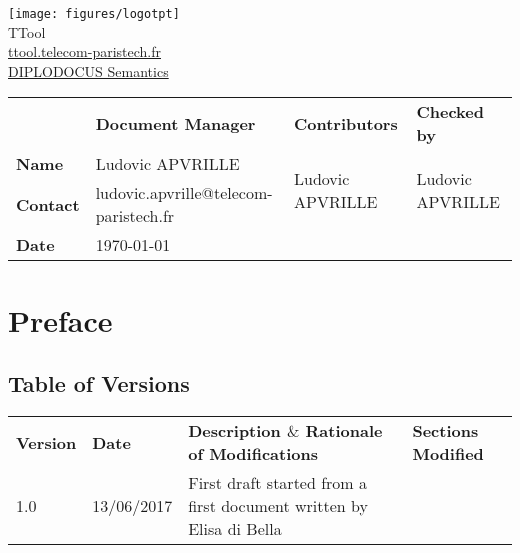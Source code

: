 \documentclass[12pt]{article}
\begin{document}
\sloppy 

\begin{center}

\texttt{[image: figures/logotpt]}
\vspace{10 pt}\\
\Huge TTool \\
\vspace{10 pt}
\Large \url{ttool.telecom-paristech.fr}
\vspace{20 pt}\\
\underline{\Large DIPLODOCUS Semantics}
\vspace{30 pt}
\end{center}

\begin{table}[H]
\large
\centering
\begin{adjustbox}{width=\textwidth}
\begin{tabular}{ |p{1.6cm}|p{6.0cm}|p{4.2cm}|p{4.2cm}| }
\hhline{----}
 & \textbf{Document Manager} & \textbf{Contributors}  & \textbf{Checked by}  \\ 
\hhline{----}
\textbf{Name}   & Ludovic APVRILLE & \multirow{2}{*}{Ludovic APVRILLE} &
\multirow{2}{*}{Ludovic APVRILLE} \\
\hhline{--~~}
\textbf{Contact} & ludovic.apvrille@telecom-paristech.fr &  &  \\ 
\hhline{--~~}
\textbf{Date} & \today &  &  \\ 
\hline
\end{tabular}
\end{adjustbox}
\end{table}

\newpage
\tableofcontents


\newpage
\section{Preface}

\subsection{Table of Versions}

\begin{table}[H]
\large
\centering
\begin{adjustbox}{width=\textwidth}
\begin{tabular}{ |p{1.5cm}|p{2.5cm}|p{9.0cm}|p{3.0cm}| }
\hhline{----}
\textbf{Version} & \textbf{Date} & \textbf{Description  $  \&  $  Rationale of
Modifications} & \textbf{Sections Modified} \\
\hhline{----}
1.0 & 13/06/2017 & First draft started from a first document written by Elisa di Bella &  \\ 
\hline
\end{tabular}
\end{adjustbox}
\end{table}
\end{document}
